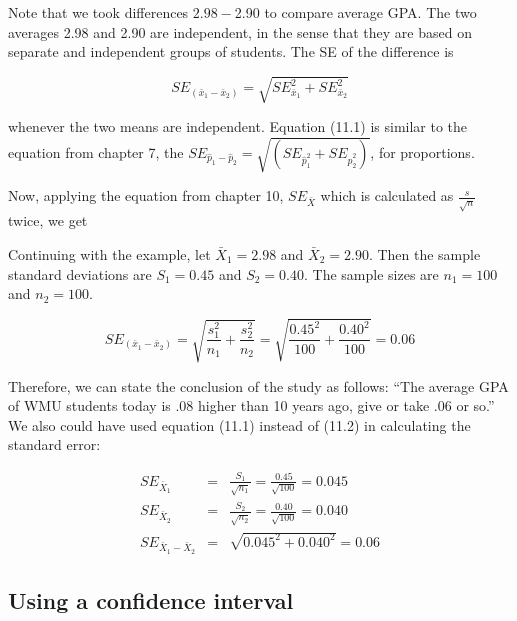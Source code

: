 \documentclass[11pt, chapterprefix=true]{scrbook}\usepackage[]{graphicx}\usepackage[]{color}
\begin{document}
Note that we took differences $2.98 - $2.90 to compare average GPA.  The two averages 2.98 and 2.90 are independent, in the sense that they are based on separate and independent groups of students.  The SE of the difference is

\begin{equation}
SE_{(\bar{x}_1 - \bar{x}_2)} = \sqrt{SE_{\bar{x}_1}^2 + SE_{\bar{x}_2}^2 }
\end{equation}

whenever the two means are independent.  Equation (11.1) is similar to the equation from chapter 7, the $SE_{\hat{p}_1 - \hat{p}_2} = \sqrt{(SE_{\hat{p}_1^2} + SE_{\hat{p}_2^2 })}$, for proportions. 

Now, applying the equation from chapter 10, $SE_{\bar{X}}$ which is calculated as $\frac{s}{\sqrt{n}}$ twice, we get


Continuing with the example, let $\bar{X}_1  = 2.98$ and $\bar{X}_2  = 2.90$.  Then the sample standard deviations are $S_1 = 0.45$ and $S_2 = 0.40$.   The sample sizes are $n_1 = 100$ and $n_2 = 100$.

\begin{equation*}
SE_{(\bar{x}_1 - \bar{x}_2)} = \sqrt{\frac{s_1^2}{n_1}  + \frac{s_2^2}{n_2} } = \sqrt{\frac{0.45^2}{100}  + \frac{0.40^2}{100} } = 0.06
\end{equation*}

Therefore, we can state the conclusion of the study as follows: ``The average GPA of WMU students today is .08 higher than 10 years ago, give or take .06 or so.'' We also could have used equation (11.1) instead of (11.2) in calculating the standard error:

\begin{eqnarray*}
SE_{\bar{X}_1} &=& \frac{S_1}{\sqrt{n_1}} = \frac{0.45}{\sqrt{100}} = 0.045 \\
SE_{\bar{X}_2} &=& \frac{S_2}{\sqrt{n_2}} = \frac{0.40}{\sqrt{100}} = 0.040 \\
SE_{\bar{X}_1 - \bar{X}_2} &=& \sqrt{0.045^2 + 0.040^2} = 0.06 
\end{eqnarray*}

\subsection{Using a confidence interval}
\end{document}
